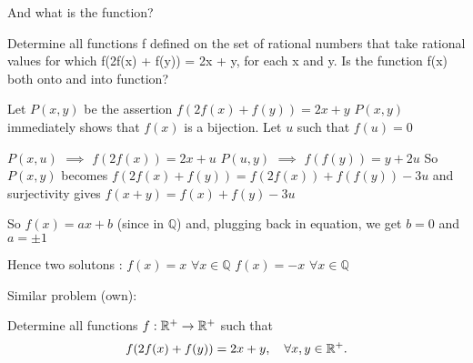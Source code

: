 \begin{solution}
	And what is the function?
\end{solution}



\begin{solution}
	\begin{tcolorbox}Determine all functions f defined on the set of rational numbers that take rational values for which 
f(2f(x) + f(y)) = 2x + y, 
for each x and y.     
Is the function f(x)  both onto and into function?\end{tcolorbox}
Let $P(x,y)$ be the assertion $f(2f(x)+f(y))=2x+y$
$P(x,y)$ immediately shows that $f(x)$ is a bijection.
Let $u$ such that $f(u)=0$

$P(x,u)$ $\implies$ $f(2f(x))=2x+u$
$P(u,y)$ $\implies$ $f(f(y))=y+2u$
So $P(x,y)$ becomes $f(2f(x)+f(y))=f(2f(x))+f(f(y))-3u$ and surjectivity gives $f(x+y)=f(x)+f(y)-3u$

So $f(x)=ax+b$ (since in $\mathbb Q$) and, plugging back in equation, we get $b=0$ and $a=\pm 1$

Hence two solutons :
$f(x)=x$ $\forall x\in\mathbb Q$
$f(x)=-x$ $\forall x\in\mathbb Q$
\end{solution}



\begin{solution}
	Similar problem (own): 


Determine all functions $f: \Bbb{R}^+ \to \Bbb{R}^+$ such that \[f(2f(x) + f(y)) = 2x + y, \ \ \ \forall x,y\in \Bbb{R}^+.\]
\end{solution}



